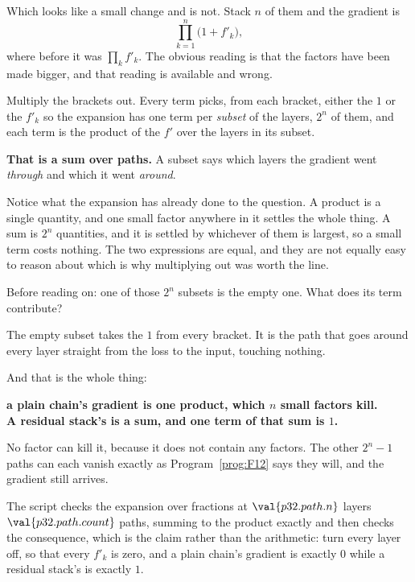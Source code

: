 \begin{fr}

Which looks like a small change and is not. Stack $n$ of them and the
gradient is
\[ \prod_{k=1}^{n} \bigl(1 + f'_k\bigr), \]
where before it was $\prod_k f'_k$. The obvious reading is that the factors
have been made bigger, and that reading is available and wrong.

Multiply the brackets out. Every term picks, from each bracket, either the
$1$ or the $f'_k$ \dash{} so the expansion has one term per \emph{subset} of
the layers, $2^{n}$ of them, and each term is the product of the $f'$ over
the layers in its subset.

\textbf{That is a sum over paths.} A subset says which layers the gradient
went \emph{through} and which it went \emph{around}.

Notice what the expansion has already done to the question. A product is a
single quantity, and one small factor anywhere in it settles the whole thing.
A sum is $2^{n}$ quantities, and it is settled by whichever of them is
largest, so a small term costs nothing. The two expressions are equal, and
they are not equally easy to reason about \dash{} which is why multiplying
out was worth the line.

Before reading on: one of those $2^{n}$ subsets is the empty one. What does
its term contribute?
\dotline
\nextframe
\end{fr}

\begin{fr}

The empty subset takes the $1$ from every bracket. It is the path that goes
around every layer \dash{} straight from the loss to the input, touching
nothing.

And that is the whole thing:

\begin{center}
\textbf{a plain chain's gradient is one product, which $n$ small factors
kill.\\
A residual stack's is a sum, and one term of that sum is $1$.}
\end{center}

No factor can kill it, because it does not contain any factors. The other
$2^{n} - 1$ paths can each vanish exactly as Program~\ref{prog:F12} says
they will, and the gradient still arrives.

The script checks the expansion over fractions at
$\val{p32.path.n}$ layers \dash{} $\val{p32.path.count}$ paths, summing to
the product exactly \dash{} and then checks the consequence, which is the
claim rather than the arithmetic: turn every layer off, so that every
$f'_k$ is zero, and a plain chain's gradient is exactly $0$ while a residual
stack's is exactly $1$.
\end{fr}

